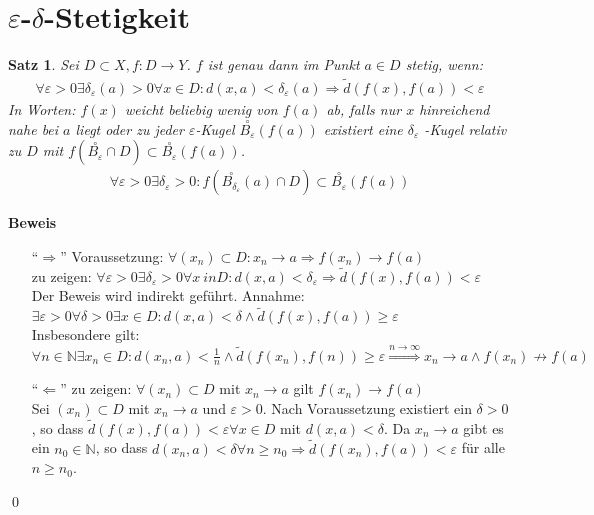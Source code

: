 \documentclass[ngerman,titlepage,twoside, parskip=half*]{scrreprt}
\newcommand*{\N}{\mathbb{N}}
\theoremstyle{plain}
\newtheorem{theorem}{Satz}[section]
\theoremstyle{definition}
\theoremstyle{remark}
\begin{document}
\section{\texorpdfstring{$\varepsilon$-$\delta$}{epsisol-delta}-Stetigkeit}
\begin{theorem}
\label{satz:e-d-stetig}
Sei $D\subset X, f\colon D\rightarrow Y$. $f$ ist genau dann im Punkt $a\in D$ stetig, wenn:
\begin{gather*}\forall \varepsilon >0 \exists \delta_{\varepsilon}(a)>0 \forall x \in D\colon d(x,a)<\delta_{\varepsilon}
(a)\Rightarrow  \tilde{d}(f(x),f(a))<\varepsilon\end{gather*}
In Worten: $f(x)$ weicht beliebig wenig von $f(a)$ ab, falls nur $x$ hinreichend nahe bei $a$ liegt oder 
zu jeder $\varepsilon$-Kugel $\stackrel{\circ}{B_{\varepsilon}}(f(a))$ existiert eine $\delta_{\varepsilon}$
-Kugel relativ zu $D$ mit $f(\stackrel{\circ}{B_{\varepsilon}}\cap D)\subset \stackrel{\circ}{B_{\varepsilon}}
(f(a))$.
\begin{gather*}\forall \varepsilon >0 \exists \delta_{\varepsilon}>0\colon f(\stackrel{\circ}{B_{\delta_{\varepsilon}}}(a)
\cap D) \subset \stackrel{\circ}{B_{\varepsilon}}(f(a))\end{gather*}
\end{theorem}
\textbf{Beweis}
\begin{itemize}
  \item["`$\Rightarrow$"'] Voraussetzung: $\forall (x_n)\subset D\colon x_n\rightarrow a \Rightarrow f(x_n)
    \rightarrow f(a)$\\
    zu zeigen: $\forall \varepsilon >0 \exists \delta_{\varepsilon} >0 \forall x\ in D\colon d(x,a)<
    \delta_{\varepsilon}\Rightarrow \tilde{d}(f(x),f(a))<\varepsilon$\\
    Der Beweis wird indirekt geführt. Annahme: $\exists \varepsilon >0 \forall \delta >0 \exists
    x \in D\colon d(x,a)<\delta \wedge \tilde{d} (f(x),f(a))\geq \varepsilon$\\
    Insbesondere gilt: $\forall n \in \N \exists x_n \in D\colon d(x_n,a)<\frac{1}{n} \wedge \tilde{d}(f(x_n),
    f(n))\geq \varepsilon \stackrel{n\rightarrow \infty}{\Longrightarrow} x_n \rightarrow a \wedge 
    f(x_n)\not\rightarrow f(a)$
   \lightning
  \item["`$\Leftarrow$"'] zu zeigen: $\forall (x_n) \subset D$ mit $x_n\rightarrow a$ gilt $f(x_n)
    \rightarrow f(a)$\\
    Sei $(x_n)\subset D$ mit $x_n\rightarrow a$ und $\varepsilon >0$. Nach Voraussetzung existiert ein
    $\delta >0$, so dass $\tilde{d}(f(x),f(a))<\varepsilon \forall x \in D$ mit $d(x,a)<\delta$. Da
    $x_n\rightarrow a$ gibt es ein $n_0\in \N$, so dass $d(x_n,a)<\delta \forall n\geq n_0
    \Rightarrow \tilde{d}(f(x_n),f(a))<\varepsilon$ für alle $n\geq n_0$.
\end{itemize}
\qed
\end{document}
